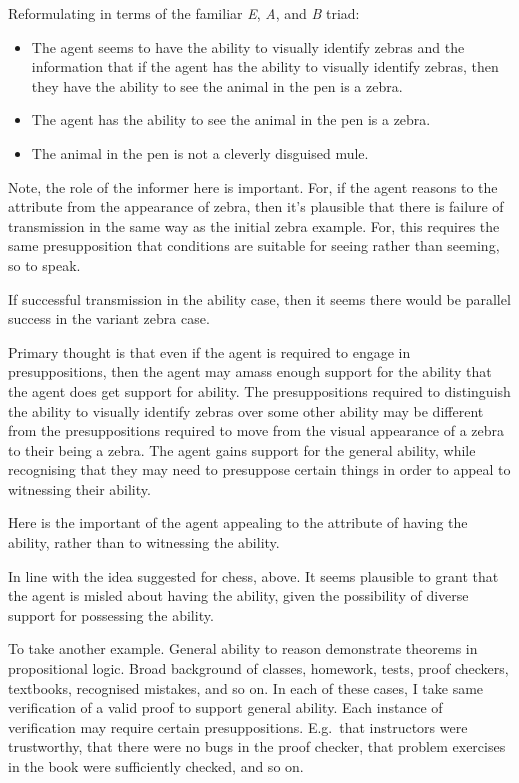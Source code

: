 \documentclass[10pt]{article}
\newcommand{\tri}[2]{\emph{#2}\(_{\text{\tiny\emph #1}}\)}
\begin{document}
\begin{note}
  Reformulating in terms of the familiar \emph{E}, \emph{A}, and \emph{B} triad:
  \begin{itemize}
  \item[\tri{Z\('\)}{E}] The agent seems to have the ability to visually identify zebras and the information that if the agent has the ability to visually identify zebras, then they have the ability to see the animal in the pen is a zebra.
  \item[\tri{Z\('\)}{A}] The agent has the ability to see the animal in the pen is a zebra.
  \item[\tri{Z\('\)}{B}] The animal in the pen is not a cleverly disguised mule.
  \end{itemize}
\end{note}

\begin{note}
  Note, the role of the informer here is important.
  For, if the agent reasons to the attribute from the appearance of zebra, then it's plausible that there is failure of transmission in the same way as the initial zebra example.
  For, this requires the same presupposition that conditions are suitable for seeing rather than seeming, so to speak.

  If successful transmission in the ability case, then it seems there would be parallel success in the variant zebra case.

  Primary thought is that even if the agent is required to engage in presuppositions, then the agent may amass enough support for the ability that the agent does get support for ability.
  The presuppositions required to distinguish the ability to visually identify zebras over some other ability may be different from the presuppositions required to move from the visual appearance of a zebra to their being a zebra.
  The agent gains support for the general ability, while recognising that they may need to presuppose certain things in order to appeal to witnessing their ability.

  Here is the important of the agent appealing to the attribute of having the ability, rather than to witnessing the ability.

  In line with the idea suggested for chess, above.
  It seems plausible to grant that the agent is misled about having the ability, given the possibility of diverse support for possessing the ability.

  To take another example.
  General ability to reason demonstrate theorems in propositional logic.
  Broad background of classes, homework, tests, proof checkers, textbooks, recognised mistakes, and so on.
  In each of these cases, I take same verification of a valid proof to support general ability.
  Each instance of verification may require certain presuppositions.
  E.g.\ that instructors were trustworthy, that there were no bugs in the proof checker, that problem exercises in the book were sufficiently checked, and so on.


\end{note}
\end{document}
